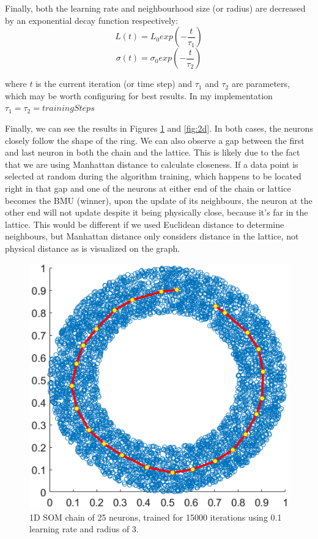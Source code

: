 \documentclass[a4paper,11pt,twocolumn]{article}
\begin{document}
Finally, both the learning rate and neighbourhood size (or radius) are decreased by an exponential decay function respectively:
\[L(t) = L_0exp(-\frac{t}{\tau_1}) \]
\[\sigma(t) = \sigma_0exp(-\frac{t}{\tau_2}) \]

where $t$ is the current iteration (or time step) and $\tau_1$ and $\tau_2$ are parameters, which may be worth configuring for best results. In my implementation $\tau_1 = \tau_2 = trainingSteps$

Finally, we can see the results in Figures \ref{fig:1d} and \ref{fig:2d}. In both cases, the neurons closely follow the shape of the ring. We can also observe a gap between the first and last neuron in both the chain and the lattice. This is likely due to the fact that we are using Manhattan distance to calculate closeness. If a data point is selected at random during the algorithm training, which happens to be located right in that gap and one of the neurons at either end of the chain or lattice becomes the BMU (winner), upon the update of its neighbours, the neuron at the other end will not update despite it being physically close, because it's far in the lattice. This would be different if we used Euclidean distance to determine neighbours, but Manhattan distance only considers distance in the lattice, not physical distance as is visualized on the graph.

\begin{figure}[!h]
  \centering
  \includegraphics[width=\linewidth/3*2]{figures/1d.png}
  \caption{1D SOM chain of 25 neurons, trained for 15000 iterations using 0.1 learning rate and radius of 3.}
  \label{fig:1d}
\end{figure}
\end{document}
